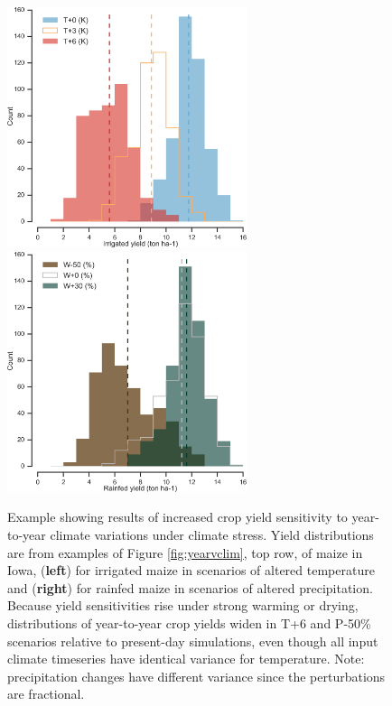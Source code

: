 \documentclass[gmdd]{copernicus} %
\begin{document}
\begin{figure}[ht]
\centering
   \includegraphics[width=7cm]{figures/hist_year_t.png} \hspace{10mm} \includegraphics[width=7cm]{figures/hist_year_pr.png}
   \caption{
   Example showing results of increased crop yield sensitivity to year-to-year climate variations under climate stress. 
   Yield distributions are from examples of Figure \ref{fig:yearvclim}, top row, of maize in Iowa, (\textbf{left}) for irrigated maize in scenarios of altered temperature and (\textbf{right}) for rainfed maize in scenarios of altered precipitation.
   Because yield sensitivities rise under strong warming or drying, distributions of year-to-year crop yields widen in T+6  and P-50\% scenarios relative to present-day simulations, even though all input climate timeseries have identical variance for temperature. Note: precipitation changes have different variance since the perturbations are fractional.  
    }
   \label{fig:yearly}
\end{figure}
\end{document}
